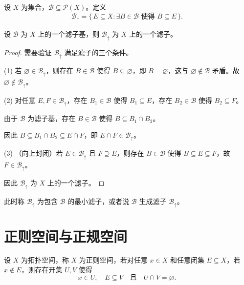 \documentclass[lang=cn,a4paper,newtx,figureplace=section,tableplace=section]{elegantbook}
\begin{document}
\begin{definition}\label{def:topology-generated-by-base}
设 $X$ 为集合，$\mathcal{B} \subseteq \mathcal{P}(X)$。定义
\begin{equation}
\mathcal{B}_{\uparrow} = \{\,E \subseteq X : \exists B \in \mathcal{B} \text{ 使得 } B \subseteq E\,\}.
\end{equation}
\end{definition}

\begin{proposition}\label{prop:filter-base-generates-filter}
设 $\mathcal{B}$ 为 $X$ 上的一个滤子基，则 $\mathcal{B}_{\uparrow}$ 为 $X$ 上的一个滤子。
\end{proposition}
\begin{proof}
需要验证 $\mathcal{B}_{\uparrow}$ 满足滤子的三个条件。

(1) 若 $\varnothing \in \mathcal{B}_{\uparrow}$，则存在 $B \in \mathcal{B}$ 使得 $B \subseteq \varnothing$，即 $B = \varnothing$，这与 $\varnothing \notin \mathcal{B}$ 矛盾。故 $\varnothing \notin \mathcal{B}_{\uparrow}$。

(2) 对任意 $E, F \in \mathcal{B}_{\uparrow}$，存在 $B_1 \in \mathcal{B}$ 使得 $B_1 \subseteq E$，存在 $B_2 \in \mathcal{B}$ 使得 $B_2 \subseteq F$。

由于 $\mathcal{B}$ 为滤子基，存在 $B \in \mathcal{B}$ 使得 $B \subseteq B_1 \cap B_2$。

因此 $B \subseteq B_1 \cap B_2 \subseteq E \cap F$，即 $E \cap F \in \mathcal{B}_{\uparrow}$。

(3) （向上封闭）若 $E \in \mathcal{B}_{\uparrow}$ 且 $F \supseteq E$，则存在 $B \in \mathcal{B}$ 使得 $B \subseteq E \subseteq F$，故 $F \in \mathcal{B}_{\uparrow}$。

因此 $\mathcal{B}_{\uparrow}$ 为 $X$ 上的一个滤子。
\end{proof}

\begin{remark}
此时称 $\mathcal{B}_{\uparrow}$ 为包含 $\mathcal{B}$ 的最小滤子，或者说 $\mathcal{B}$ 生成滤子 $\mathcal{B}_{\uparrow}$。
\end{remark}

\section{正则空间与正规空间}

\begin{definition}[正则空间]\label{def:regular-space}
设 $X$ 为拓扑空间，称 $X$ 为正则空间，若对任意 $x \in X$ 和任意闭集 $E \subseteq X$，若 $x \notin E$，则存在开集 $U, V$ 使得
\begin{equation}
x \in U, \quad E \subseteq V \quad \text{且} \quad U \cap V = \varnothing.
\end{equation}
\end{definition}
\end{document}
